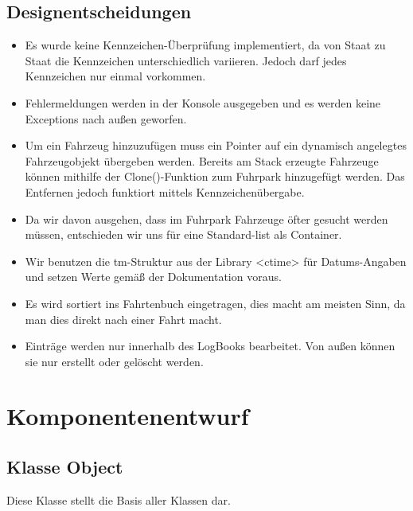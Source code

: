 \subsection{Designentscheidungen}
\begin{itemize}
\item Es wurde keine Kennzeichen-Überprüfung implementiert, da von Staat zu Staat die Kennzeichen unterschiedlich variieren. Jedoch darf jedes Kennzeichen nur einmal vorkommen. 
\item Fehlermeldungen werden in der Konsole ausgegeben und es werden keine Exceptions nach außen geworfen. 
\item Um ein Fahrzeug hinzuzufügen muss ein Pointer auf ein dynamisch angelegtes Fahrzeugobjekt übergeben werden. Bereits am Stack erzeugte Fahrzeuge können mithilfe der Clone()-Funktion zum Fuhrpark hinzugefügt werden. Das Entfernen jedoch funktiort mittels Kennzeichenübergabe. 
\item Da wir davon ausgehen, dass im Fuhrpark Fahrzeuge öfter gesucht werden müssen, entschieden wir uns für eine Standard-list als Container. 
\item Wir benutzen die tm-Struktur aus der Library \string<ctime\string> für Datums-Angaben und setzen Werte gemäß der Dokumentation voraus.  
\item Es wird sortiert ins Fahrtenbuch eingetragen, dies macht am meisten Sinn, da man dies direkt nach einer Fahrt macht. 
\item Einträge werden nur innerhalb des LogBooks bearbeitet. Von außen können sie nur erstellt oder gelöscht werden. 
\end{itemize}





\newpage
\section{Komponentenentwurf}

\subsection{Klasse Object}
Diese Klasse stellt die Basis aller Klassen dar.

